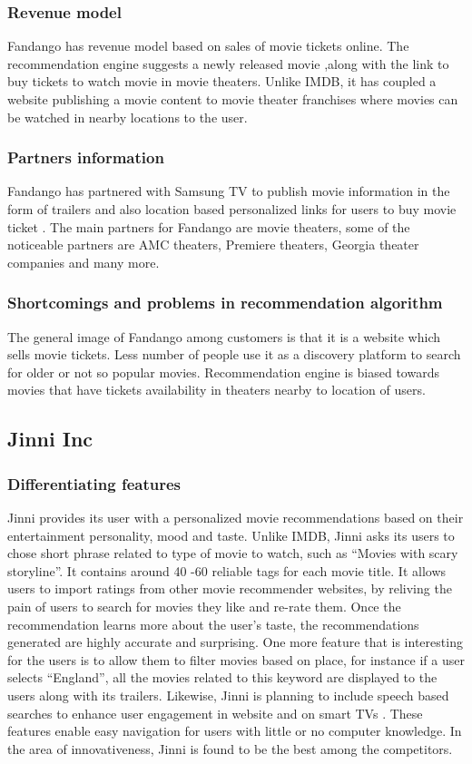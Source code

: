   \subsubsection{Revenue model}
  \label{Fandango_overview_DF}
   Fandango has revenue model based on sales of movie tickets online. The recommendation engine suggests a newly released movie ,along with the link to buy tickets to watch movie in movie theaters. Unlike \acrshort{IMDB}, it has coupled a website publishing a movie content to movie theater franchises where movies can be watched in nearby locations to the user.    
  \subsubsection{Partners information}
  \label{Fandango_overview_IP}
   Fandango has partnered with Samsung TV to publish movie information in the form of trailers and also location based personalized links for users to buy movie ticket \citep{Fanda7_online}. The main partners for Fandango are movie theaters, some of the noticeable partners are AMC theaters, Premiere theaters, Georgia theater companies and many more.
  \subsubsection{Shortcomings and problems in recommendation algorithm } 
  \label{Fandango_overview_SP}
   The general image of Fandango among customers is that it is a website which sells movie tickets. Less number of people use it as a discovery platform to search for older or not so popular movies. Recommendation engine is biased towards movies that have tickets availability in theaters nearby to location of users.     

 \subsection{Jinni Inc}
  \label{Jinni_overview}
  \subsubsection{Differentiating features}
   Jinni provides its user with a personalized movie recommendations based on their entertainment personality, mood and taste. Unlike \acrshort{IMDB}, Jinni asks its users to chose short phrase related to type of movie to watch, such as ``Movies with scary storyline''. It contains around 40 -60 reliable tags for each movie title. It allows users to import ratings from other movie recommender websites, by reliving the pain of users to search for movies they like and re-rate them. Once the recommendation learns more about the user's taste, the recommendations generated are highly accurate and surprising. One more feature that is interesting for the users is to allow them to filter movies based on place, for instance if a user selects ``England'', all the movies related to this keyword are displayed to the users along with its trailers. Likewise, Jinni is planning to include speech based searches to enhance user engagement in website and on smart TVs \citep{Jinni0_online}. These features enable easy navigation for users with little or no computer knowledge. In the area of innovativeness, Jinni is found to be the best among the competitors.   
